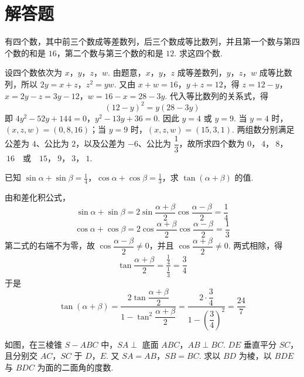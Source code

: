 \section{解答题}

\begin{problem}
有四个数，其中前三个数成等差数列，后三个数成等比数列，并且第一个数与第四个数的和是 \(16\)，第二个数与第三个数的和是 \(12\). 求这四个数.
\end{problem}

\begin{solution}
设四个数依次为 \(x\)，\(y\)，\(z\)，\(w\). 由题意，\(x\)，\(y\)，\(z\) 成等差数列，\(y\)，\(z\)，\(w\) 成等比数列，所以
\(2y=x+z\)，\(z^2=yw\).
又由 \(x+w=16\)，\(y+z=12\)，得 \(z=12-y\)，\(x=2y-z=3y-12\)，\(w=16-x=28-3y\). 代入等比数列的关系式，得
\[
(12-y)^2=y(28-3y)
\]
即
\(4y^2-52y+144=0\)，\(y^2-13y+36=0\).
因此 \(y=4\) 或 \(y=9\). 当 \(y=4\) 时，\((x,z,w)=(0,8,16)\)；当 \(y=9\) 时，\((x,z,w)=(15,3,1)\). 两组数分别满足公差为 \(4\)、公比为 \(2\)，以及公差为 \(-6\)、公比为 \(\dfrac{1}{3}\)，故所求四个数为
\(0\)，\(\ 4\)，\(\ 8\)，\(\ 16\quad\text{或}\quad 15\)，\(\ 9\)，\(\ 3\)，\(\ 1\).
\end{solution}

\begin{problem}
已知 \(\sin \alpha+\sin \beta=\frac{1}{4}\)，\(\cos \alpha+\cos \beta=\frac{1}{3}\)，求 \(\tan(\alpha+\beta)\) 的值.
\end{problem}

\begin{solution}
由和差化积公式，
\[
\sin\alpha+\sin\beta=2\sin\frac{\alpha+\beta}{2}\cos\frac{\alpha-\beta}{2}=\frac{1}{4}
\]
\[
\cos\alpha+\cos\beta=2\cos\frac{\alpha+\beta}{2}\cos\frac{\alpha-\beta}{2}=\frac{1}{3}
\]
第二式的右端不为零，故 \(\cos\dfrac{\alpha-\beta}{2}\neq0\)，并且 \(\cos\dfrac{\alpha+\beta}{2}\neq0\). 两式相除，得
\[
\tan\frac{\alpha+\beta}{2}=\frac{\frac{1}{4}}{\frac{1}{3}}=\frac{3}{4}
\]
于是
\[
\tan(\alpha+\beta)=\frac{2\tan\dfrac{\alpha+\beta}{2}}{1-\tan^2\dfrac{\alpha+\beta}{2}}
=\frac{2\cdot\dfrac{3}{4}}{1-\left(\dfrac{3}{4}\right)^2}
=\frac{24}{7}
\]
\end{solution}

\begin{problem}
如图，在三棱锥 \(S-ABC\) 中，\(SA\perp\) 底面 \(ABC\)，\(AB\perp BC\). \(DE\) 垂直平分 \(SC\)，且分别交 \(AC\)，\(SC\) 于 \(D\)，\(E\). 又 \(SA=AB\)，\(SB=BC\). 求以 \(BD\) 为棱，以 \(BDE\) 与 \(BDC\) 为面的二面角的度数.

\end{problem}

